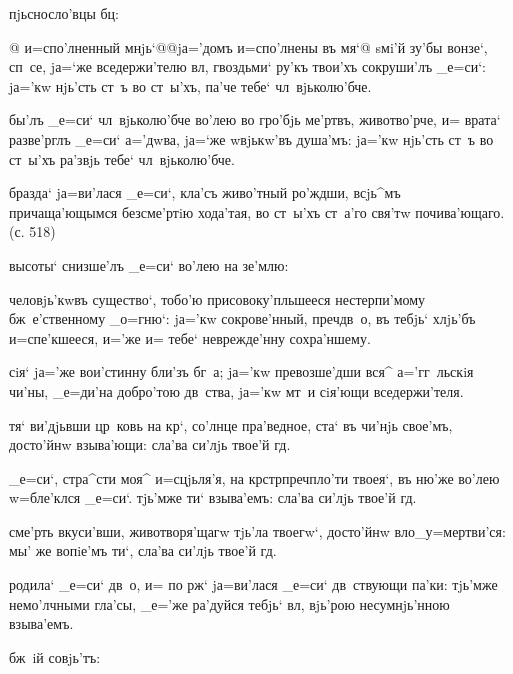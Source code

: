 
 пjьсносло'вцы бц:

@ и=спо'лненный мнjь`@{@jа='домъ 
и=спо'лнены въ мя`@} sмi'й зу'бы вонзе`, сп~се, jа=`же 
вседержи'телю вл, гвоздьми` ру'къ твои'хъ сокруши'лъ 
_е=си`: jа='кw нjь'сть ст~ъ во ст~ы'хъ, па'че тебе` 
чл~вjьколю'бче.

 бы'лъ _е=си` чл~вjьколю'бче во'лею во 
гро'бjь ме'ртвъ, животво'рче, и= врата` разве'рглъ _е=си` 
а='дwва, jа=`же w\т вjькw'въ душа'мъ: jа='кw нjь'сть ст~ъ 
во ст~ы'хъ ра'звjь тебе` чл~вjьколю'бче.

  бразда` jа=ви'лася _е=си`, 
кла'съ живо'тный ро'ждши, всjь^мъ причаща'ющымся 
безсме'ртiю хода'тая, во ст~ы'хъ ст~а'го свя'тw 
почива'ющаго. (с. 518)

  высоты` снизше'лъ _е=си` 
во'лею на зе'млю:

 человjь'кwвъ существо`, тобо'ю 
присовоку'пльшееся нестерпи'мому бж~е'ственному _о=гню`: 
jа='кw сокрове'нный, преч дв~о, въ тебjь` хлjь'бъ 
и=спе'кшееся, и='же и= тебе` неврежде'нну сохра'ншему.

 сiя` jа='же вои'стинну бли'зъ бг~а; jа='кw 
превозше'дши вся^ а='гг~льскiя чи'ны, _е=ди'на добро'тою 
дв~ства, jа='кw мт~и сiя'ющи вседержи'теля.


 тя` ви'дjьвши цр~ковь на 
кр`, со'лнце пра'ведное, ста` въ чи'нjь свое'мъ, 
досто'йнw взыва'ющи: сла'ва си'лjь твое'й гд.

 _е=си`, стра^сти моя^ и=сцjьля'я, на 
кр стр преч пло'ти твоея`, въ ню'же во'лею 
w=бле'клся _е=си`. тjь'мже ти` взыва'емъ: сла'ва си'лjь 
твое'й гд.

 сме'рть вкуси'вши, животворя'щагw 
тjь'ла твоегw`, досто'йнw вл о_у=мертви'ся: мы' же 
вопiе'мъ ти`, сла'ва си'лjь твое'й гд.

  родила` _е=си` 
дв~о, и= по рж` jа=ви'лася _е=си` дв~ствующи па'ки: 
тjь'мже немо'лчными гла'сы, _е='же ра'дуйся тебjь` 
вл, вjь'рою несумнjь'нною взыва'емъ.

  бж~iй совjь'тъ:

